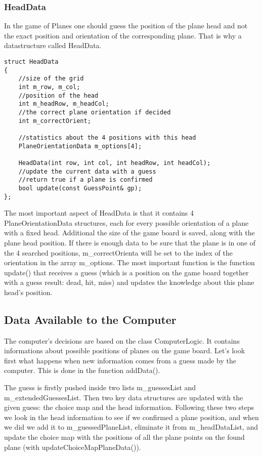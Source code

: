 \subsubsection{HeadData}

In the game of Planes one should guess the position of the plane head and not the exact position and orientation of the corresponding plane. That is why a datastructure called HeadData.

\begin{lstlisting}
struct HeadData
{
	//size of the grid
	int m_row, m_col;
	//position of the head
	int m_headRow, m_headCol;
	//the correct plane orientation if decided
	int m_correctOrient;
	
	//statistics about the 4 positions with this head
	PlaneOrientationData m_options[4];
	
	HeadData(int row, int col, int headRow, int headCol);
	//update the current data with a guess
	//return true if a plane is confirmed
	bool update(const GuessPoint& gp);
};
\end{lstlisting}

The most important aspect of HeadData is that it contains 4 PlaneOrientationData structures, each for every possible orientation of a plane with a fixed head. Additional the size of the game board is saved, along with the plane head position. If there is enough data to be sure that the plane is in one of the 4 searched positions, m\_correctOrienta will be set to the index of the orientation in the array m\_options. The most important function is the function update() that receives a guess (which is a position on the game board together with a guess result: dead, hit, miss) and updates the knowledge about this plane head's position.

\subsection{Data Available to the Computer}

The computer's decisions are based on the class ComputerLogic. It contains informations about possible positions of planes on the game board. Let's look first what happens when new information comes from a guess made by the computer. This is done in the function addData().

The guess is firstly pushed inside two lists m\_guessesList and m\_extendedGuessesList. Then two key data structures are updated with the given guess: the choice map and the head information. Following these two steps we look in the head information to see if we confirmed a plane position, and when we did we add it to m\_guessedPlaneList, eliminate it from m\_headDataList, and update the choice map with the positions of all the plane points on the found plane (with updateChoiceMapPlaneData()).


